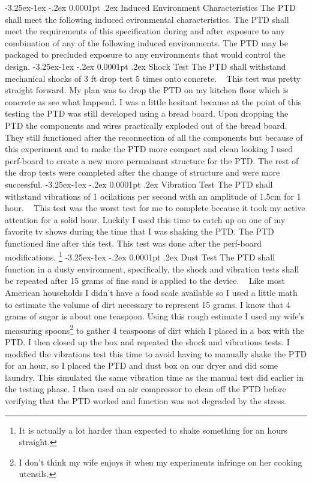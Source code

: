 \documentclass[11pt]{article}
\makeatletter
\renewcommand\paragraph{\@startsection{paragraph}{4}{\z@}%
                                     {-3.25ex\@plus -1ex \@minus -.2ex}%
                                     {0.0001pt \@plus .2ex}%
                                     {\normalfont\normalsize\bfseries}}
\renewcommand\subparagraph{\@startsection{subparagraph}{5}{\z@}%
                                     {-3.25ex\@plus -1ex \@minus -.2ex}%
                                     {0.0001pt \@plus .2ex}%
                                     {\normalfont\normalsize\bfseries}}
\makeatother
\begin{document}
\paragraph{Induced Environment Characteristics}
The PTD shall meet the following induced evironmental characteristics. The PTD shall meet the requirements of this specification during 
and after exposure to any combination of any of the following induced environments. The PTD may be packaged to precluded exposure to any 
environments that would control the design.
    \subparagraph{Shock Test}  The PTD shall withstand mechanical shocks of 3 ft drop test 5 times onto concrete. \newline ~ \newline
        This test was pretty straight forward. My plan was to drop the PTD on my kitchen floor which is concrete as see what happend. I was a little hesitant because at the point of this 
        testing the PTD was still developed using a bread board. Upon dropping the PTD the components and wires practically exploded out of the bread board. They still functioned after 
        the reconnection of all the components but because of this experiment and to make the PTD more compact and clean looking I used perf-board to create a new more permainant structure for the 
        PTD. The rest of the drop tests were completed after the change of structure and were more successful.
    \subparagraph{Vibration Test}  The PTD shall withstand vibrations of 1 ocilations per second with an amplitude of 1.5cm for 1 hour. \newline ~ \newline
        This test was the worst test for me to complete because it took my active attention for a solid hour. Luckily I used this time to catch up on one of my favorite tv shows during the time that 
        I was shaking the PTD. The PTD functioned fine after this test. This test was done after the perf-board modifications. \footnote{It is actually a lot harder than expected to shake something 
        for an hours straight.}
    \subparagraph{Dust Test}  The PTD shall function in a dusty environment, specifically, the shock and vibration tests shall be repeated 
        after 15 grams of fine sand is applied to the device. \newline ~ \newline 
        Like most American households I didn't have a food scale available so I used a little math to estimate the volume of dirt necessary to represent 15 grams. I know that 4 grams of sugar is about
        one teaspoon. Using this rough estimate I used my wife's measuring spoons\footnote{I don't think my wife enjoys it when my experiments infringe on her cooking utensils.} to gather 4 
        teaspoons of dirt which I placed in a box with the PTD. I then closed up the box and repeated the shock and vibrations tests. I modified the vibrations test this time to avoid having to manually shake 
        the PTD for an hour, so I placed the PTD and dust box on our dryer and did some laundry. This simulated the same vibration time as the manual test did earlier in the testing phase. I then used an air 
        compressor to clean off the PTD before verifying that the PTD worked and function was not degraded by the stress.
\end{document}
